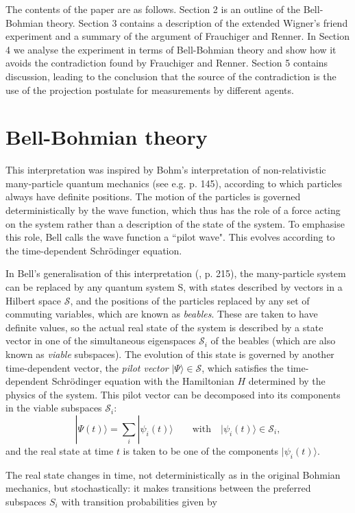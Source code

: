 \documentclass[12pt,reqno]{article}
\renewcommand{\(}{\left(}
\renewcommand{\)}{\right)}
\renewcommand{\.}{\centerdot}
\newcommand{\1}{\mathbf{1}}
\renewcommand{\S}{\mathcal{S}}
\newcommand{\<}{\langle}
\renewcommand{\>}{\rangle}
\theoremstyle{definition}
\theoremstyle{remark}
\numberwithin{equation}{section}
\begin{document}
The contents of the paper are as follows. Section 2 is an outline of the Bell-Bohmian theory. Section 3 contains a description of the extended Wigner's friend experiment and a summary of the argument of Frauchiger and Renner. In Section 4 we analyse the experiment in terms of Bell-Bohmian theory and show how it avoids the contradiction found by Frauchiger and Renner. Section 5 contains discussion, leading to the conclusion that the source of the contradiction is the use of the projection postulate for measurements by different agents.

\section{Bell-Bohmian theory}\label{BellBohm}

This interpretation was inspired by Bohm's interpretation of non-relativistic many-particle quantum mechanics (see e.g. \cite{Bohmian} p. 145), according to which particles always have definite positions. The motion of the particles is governed deterministically by the wave function, which thus has the role of a force acting on the system rather than a description of the state of the system. To emphasise this role, Bell \cite{Bell:pilot} calls the wave function a ``pilot wave". This evolves according to the time-dependent Schr\"odinger equation.

In Bell's generalisation of this interpretation (\cite{Bell:beables}, \cite{QMPN} p. 215), the many-particle system can be replaced by any quantum system S, with states described by vectors in a Hilbert space $\mathcal{S}$, and the positions of the particles replaced by any set of commuting variables, which are known as \emph{beables}. These are taken to have definite values, so the actual real state of the system is described by a state vector in one of the simultaneous eigenspaces $\S_i$ of the beables (which are also known \cite{QMPN} as \emph{viable} subspaces). The evolution of this state is governed by another time-dependent vector, the \emph{pilot vector} $|\Psi\>\in \S$, which satisfies the time-dependent Schr\"odinger equation with the Hamiltonian $H$ determined by the physics of the system. This pilot vector can be decomposed into its components in the viable subspaces $\S_i$:
\[
|\Psi(t)\> = \sum_i |\psi_i(t)\> \qquad \text{with} \quad |\psi_i(t)\> \in \S_i,
\]
and the real state at time $t$ is taken to be one of the components $|\psi_i(t)\>$.

The real state changes in time, not deterministically as in the original Bohmian mechanics, but stochastically: it makes transitions between the preferred subspaces $S_i$ with transition probabilities given by 
\end{document}
